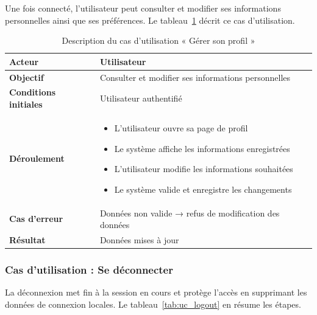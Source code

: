 Une fois connecté, l’utilisateur peut consulter et modifier ses informations personnelles ainsi que ses préférences. Le tableau~\ref{tab:uc_profile} décrit ce cas d’utilisation.

\begin{table}[H]
\centering
\renewcommand{\arraystretch}{1.2}
\begin{tabular}{|p{4cm}|p{10cm}|}
\hline
\textbf{Acteur} & Utilisateur \\ \hline

\textbf{Objectif} & Consulter et modifier ses informations personnelles \\ \hline

\textbf{Conditions initiales} & Utilisateur authentifié \\ \hline

\textbf{Déroulement} &
\begin{itemize}
    \item L’utilisateur ouvre sa page de profil
    \item Le système affiche les informations enregistrées
    \item L’utilisateur modifie les informations souhaitées
    \item Le système valide et enregistre les changements
\end{itemize} \\ \hline

\textbf{Cas d’erreur} & Données non valide → refus de modification des données \\ \hline

\textbf{Résultat} & Données mises à jour \\ \hline
\end{tabular}
\caption{Description du cas d’utilisation « Gérer son profil »}
\label{tab:uc_profile}
\end{table}

\subsubsection{Cas d’utilisation : Se déconnecter}

La déconnexion met fin à la session en cours et protège l’accès en supprimant les données de connexion locales. Le tableau~\ref{tab:uc_logout} en résume les étapes.

